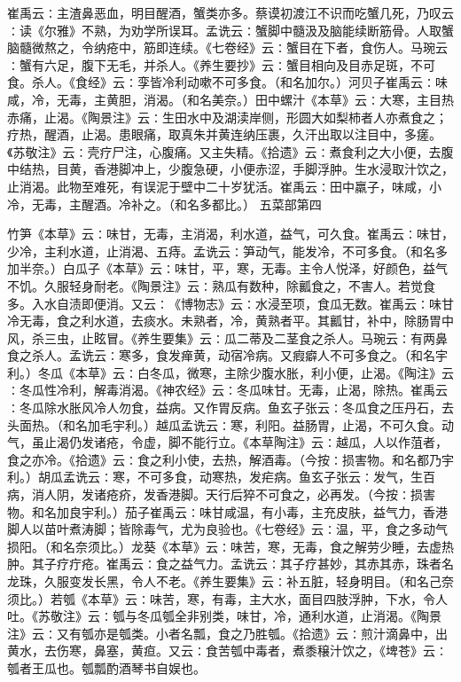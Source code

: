 \documentclass[a4paper,12pt,UTF8,twoside]{ctexbook}
\begin{document}
崔禹云∶主渣鼻恶血，明目醒酒，蟹类亦多。蔡谟初渡江不识而吃蟹几死，乃叹云∶读《尔雅》不熟，为劝学所误耳。孟诜云∶蟹脚中髓汲及脑能续断筋骨。人取蟹脑髓微熬之，令纳疮中，筋即连续。《七卷经》云∶蟹目在下者，食伤人。马琬云∶蟹有六足，腹下无毛，并杀人。《养生要抄》云∶蟹目相向及目赤足斑，不可食。杀人。《食经》云∶孪皆冷利动嗽不可多食。（和名加尔。）河贝子崔禹云∶味咸，冷，无毒，主黄胆，消渴。（和名美奈。）田中螺汁《本草》云∶大寒，主目热赤痛，止渴。《陶景注》云∶生田水中及湖渎岸侧，形圆大如梨柿者人亦煮食之；疗热，醒酒，止渴。患眼痛，取真朱并黄连纳压裹，久汗出取以注目中，多瘥。《苏敬注》云∶壳疗尸注，心腹痛。又主失精。《拾遗》云∶煮食利之大小便，去腹中结热，目黄，香港脚冲上，少腹急硬，小便赤涩，手脚浮肿。生水浸取汁饮之，止消渴。此物至难死，有误泥于壁中二十岁犹活。崔禹云∶田中羸子，味咸，小冷，无毒，主醒酒。冷补之。（和名多都比。）
五菜部第四

竹笋《本草》云∶味甘，无毒，主消渴，利水道，益气，可久食。崔禹云∶味甘，少冷，主利水道，止消渴、五痔。孟诜云∶笋动气，能发冷，不可多食。（和名多加半奈。）白瓜子《本草》云∶味甘，平，寒，无毒。主令人悦泽，好颜色，益气不饥。久服轻身耐老。《陶景注》云∶熟瓜有数种，除瓤食之，不害人。若觉食多。入水自渍即便消。又云∶《博物志》云∶水浸至项，食瓜无数。崔禹云∶味甘冷无毒，食之利水道，去痰水。未熟者，冷，黄熟者平。其瓤甘，补中，除肠胃中风，杀三虫，止眩冒。《养生要集》云∶瓜二蒂及二茎食之杀人。马琬云∶有两鼻食之杀人。孟诜云∶寒多，食发瘅黄，动宿冷病。又瘕癖人不可多食之。（和名宇利。）冬瓜《本草》云∶白冬瓜，微寒，主除少腹水胀，利小便，止渴。《陶注》云∶冬瓜性冷利，解毒消渴。《神农经》云∶冬瓜味甘。无毒，止渴，除热。崔禹云∶冬瓜除水胀风冷人勿食，益病。又作胃反病。鱼玄子张云∶冬瓜食之压丹石，去头面热。（和名加毛宇利。）越瓜孟诜云∶寒，利阳。益肠胃，止渴，不可久食。动气，虽止渴仍发诸疮，令虚，脚不能行立。《本草陶注》云∶越瓜，人以作菹者，食之亦冷。《拾遗》云∶食之利小使，去热，解酒毒。（今按∶损害物。和名都乃宇利。）胡瓜孟诜云∶寒，不可多食，动寒热，发疟病。鱼玄子张云∶发气，生百病，消人阴，发诸疮疥，发香港脚。天行后猝不可食之，必再发。（今按∶损害物。和名加良宇利。）茄子崔禹云∶味甘咸温，有小毒，主充皮肤，益气力，香港脚人以苗叶煮涛脚；皆除毒气，尤为良验也。《七卷经》云∶温，平，食之多动气损阳。（和名奈须比。）龙葵《本草》云∶味苦，寒，无毒，食之解劳少睡，去虚热肿。其子疗疔疮。崔禹云∶食之益气力。孟诜云∶其子疗甚妙，其赤其赤，珠者名龙珠，久服变发长黑，令人不老。《养生要集》云∶补五脏，轻身明目。（和名己奈须比。）若瓠《本草》云∶味苦，寒，有毒，主大水，面目四肢浮肿，下水，令人吐。《苏敬注》云∶瓠与冬瓜瓠全非别类，味甘，冷，通利水道，止消渴。《陶景注》云∶又有瓠亦是瓠类。小者名瓢，食之乃胜瓠。《拾遗》云∶煎汁滴鼻中，出黄水，去伤寒，鼻塞，黄疸。又云∶食苦瓠中毒者，煮黍穣汁饮之，《埤苍》云∶瓠者王瓜也。瓠瓢酌酒琴书自娱也。
\end{document}
